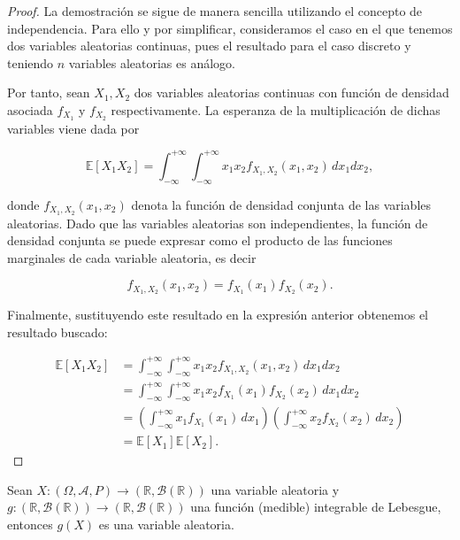 \begin{proof}
    La demostración se sigue de manera sencilla utilizando el concepto de independencia. Para ello y por simplificar, consideramos el caso en el que tenemos dos variables aleatorias continuas, pues el resultado para el caso discreto y teniendo $n$ variables aleatorias es análogo.

    Por tanto, sean $X_1, X_2$ dos variables aleatorias continuas con función de densidad asociada $f_{X_1}$ y $f_{X_2}$ respectivamente. La esperanza de la multiplicación de dichas variables viene dada por

    \[ \mathbb{E}[X_1X_2] = \int_{-\infty}^{+\infty}\int_{-\infty}^{+\infty} x_1x_2 f_{X_1, X_2} (x_1, x_2) \, dx_1dx_2, \]

    donde $f_{X_1, X_2} (x_1, x_2)$ denota la función de densidad conjunta de las variables aleatorias. Dado que las variables aleatorias son independientes, la función de densidad conjunta se puede expresar como el producto de las funciones marginales de cada variable aleatoria, es decir

    \[ f_{X_1, X_2} (x_1, x_2) = f_{X_1}(x_1) f_{X_2}(x_2). \]

    Finalmente, sustituyendo este resultado en la expresión anterior obtenemos el resultado buscado:

    \begin{align*}
        \mathbb{E}[X_1 X_2] &= \int_{-\infty}^{+\infty} \int_{-\infty}^{+\infty} x_1 x_2 f_{X_1, X_2}(x_1, x_2) \, dx_1 dx_2 \\
        &= \int_{-\infty}^{+\infty} \int_{-\infty}^{+\infty} x_1 x_2 f_{X_1}(x_1) f_{X_2}(x_2) \, dx_1 dx_2 \\
        &= \left(\int_{-\infty}^{+\infty} x_1 f_{X_1}(x_1) \, dx_1\right)
           \left(\int_{-\infty}^{+\infty} x_2 f_{X_2}(x_2) \, dx_2\right) \\
        &= \mathbb{E}[X_1] \mathbb{E}[X_2].
    \end{align*}
    
\end{proof}

\begin{proposicion}
    Sean $X: (\Omega, \mathcal{A}, P) \to (\mathbb{R}, \mathcal{B}(\mathbb{R}))$ una variable aleatoria y $g:(\mathbb{R},\mathcal{B}(\mathbb{R})) \to (\mathbb{R},\mathcal{B}(\mathbb{R}))$ una función (medible) integrable de Lebesgue, entonces $g(X)$ es una variable aleatoria.
\end{proposicion}

